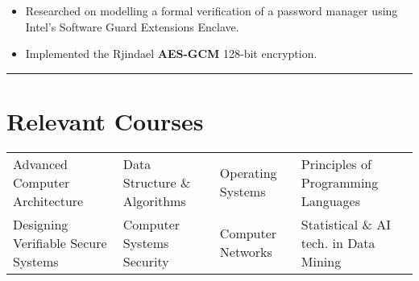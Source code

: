 \documentclass[10pt, margin=0.5in]{deedy-resume-openfont}
\begin{document}
\begin{minipage}[t]{0.48\textwidth}
\vspace{5pt}
\begin{itemize}[leftmargin=*, noitemsep]
  \item Researched on modelling a formal verification of a password manager using Intel's Software Guard Extensions Enclave.
  \item Implemented the Rjindael \textbf{AES-GCM} 128-bit encryption.
\end{itemize}
\end{minipage}

\vspace{2pt}				%
\rule{\textwidth}{0.5pt}	%
\vspace{-18pt}				%

\section{\hspace{0.5cm}Relevant Courses}
\hspace{-6pt} \begin{tabular*}{\textwidth}{llll}
Advanced Computer Architecture & Data Structure \& Algorithms & Operating Systems & Principles of Programming Languages \\
Designing Verifiable Secure Systems & Computer Systems Security & Computer Networks & Statistical \&
AI tech. in Data Mining \\
\end{tabular*}
\end{document}
